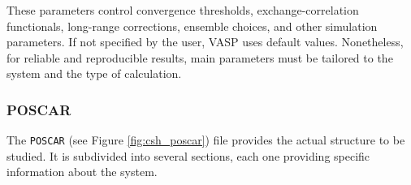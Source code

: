 These parameters control convergence thresholds, exchange-correlation functionals, long-range corrections, ensemble choices, and other simulation parameters. If not specified by the user, VASP uses default values. Nonetheless, for reliable and reproducible results, main parameters must be tailored to the system and the type of calculation.


\subsubsection{POSCAR}
The \texttt{POSCAR} (see Figure \ref{fig:csh_poscar}) file provides the actual structure to be studied. It is subdivided into several sections, each one providing specific information about the system.
\begin{figure}[H]
\end{figure}
